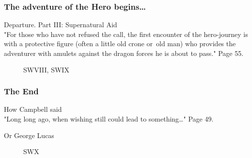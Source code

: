 \documentclass[10pt,t]{beamer}
\begin{document}
\begin{frame}
  \frametitle{The adventure of the Hero begins\ldots}


  Departure. Part III: Supernatural Aid \\
  "For those who have not refused the call, the first encounter of
  the hero-journey is with a protective figure (often a little old
  crone or~old man) who provides the adventurer with amulets against
  the dragon forces he is about to pass." Page 55.


  \begin{figure}

    \centering

    SWVIII, SWIX

  \end{figure}

\end{frame}





\begin{frame}
  \frametitle{The End}


  How Campbell said \\
  "Long long ago, when wishing still could lead to something\ldots"
  Page 49.

  Or George Lucas


  \begin{figure}

    \centering


    SWX

  \end{figure}

\end{frame}





\end{document}
